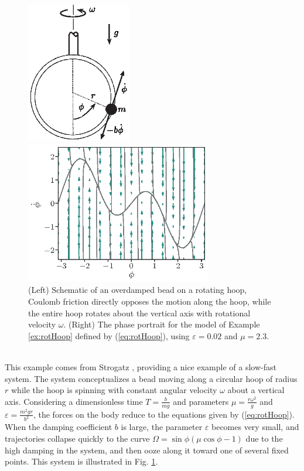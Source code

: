 \documentclass[twocolumn]{svjour3}
\begin{document}
\begin{figure}
\begin{minipage}{3.2in}
\centering
\includegraphics[width=1.8in]{Figures/bead_in_hoop-update.eps}
\end{minipage}
\begin{minipage}{3.2in}
\centering
\includegraphics[width=3.2in]{Figures/PhasePlot_rotating-hoop.eps}
\end{minipage}
\caption{\label{fig:rotHoopA} (Left) Schematic of an overdamped bead on a rotating hoop, Coulomb friction directly opposes the motion along the hoop, while the entire hoop rotates about the vertical axis with rotational velocity $\omega$. (Right) The phase portrait for the model of Example \ref{ex:rotHoop} defined by (\ref{eq:rotHoop}), using $\varepsilon = 0.02$ and $\mu = 2.3$.}
\end{figure}

 \\
This example comes from Strogatz \cite[Section 3.5]{strogatz_nonlinear_2014}, providing a nice example of a slow-fast system. The system conceptualizes a bead moving along a circular hoop of radius $r$ while the hoop is spinning with constant angular velocity $\omega$ about a vertical axis. Considering a dimensionless time $T=\tfrac{b}{mg}$ and parameters $\mu=\tfrac{r\omega^2}{g}$ and $\varepsilon=\tfrac{m^2gr}{b^2}$, the forces on the body reduce to the equations given by (\ref{eq:rotHoop}). When the damping coefficient $b$ is large, the parameter $\varepsilon$ becomes very small, and trajectories collapse quickly to the curve $\Omega = \sin\phi (\mu \cos\phi - 1)$ due to the high damping in the system, and then ooze along it toward one of several fixed points. This system is illustrated in Fig. \ref{fig:rotHoopA}.
\end{document}
